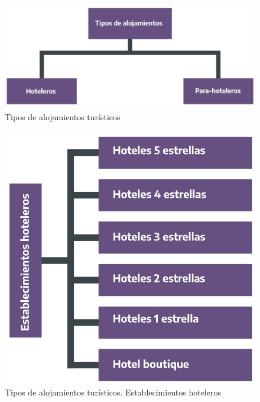 \documentclass[
]{book}
\begin{document}
\begin{figure}

{\centering \includegraphics[width=0.8\linewidth]{imagenes/figura_3} 

}

\caption{Tipos de alojamientos turísticos}\label{fig:tipos-alojamientos}
\end{figure}

\begin{figure}

{\centering \includegraphics[width=0.8\linewidth]{imagenes/figura_3_1} 

}

\caption{Tipos de alojamientos turísticos. Establecimientos hoteleros}\label{fig:establecimientos-hoteleros}
\end{figure}
\end{document}
